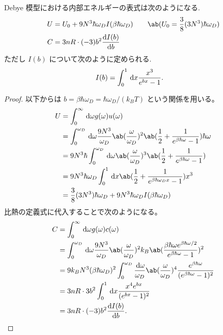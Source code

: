 \documentclass[a4paper,11pt]{jlreq}
\begin{document}
\begin{theorem}
  Debye 模型における内部エネルギーの表式は次のようになる.
  \begin{align}
    U & = U_0 + 9N^3\hbar\omega_DI(\beta\hbar\omega_D) \qquad \ab(U_0 = \frac{3}{8}(3N^3)\hbar\omega_D) \\
    C & = 3nR\cdot(-3)b^2\diff{I(b)}{b}
  \end{align}
  ただし $I(b)$ について次のように定められる.
  \begin{align}
    I(b) & = \int_0^1\dl{x}\frac{x^3}{e^{bx} - 1}.
  \end{align}
\end{theorem}
\begin{proof}
  以下からは $b = \beta\hbar\omega_D = \hbar\omega_D/(k_BT)$ という関係を用いる。
  \begin{align}
    U & = \int_0^\infty\dl{\omega}g(\omega)u(\omega)                                                                                                      \\
      & = \int_0^{\omega_D}\dl{\omega}\frac{9N^3}{\omega_D}\ab(\frac{\omega}{\omega_D})^2\ab(\frac{1}{2} + \frac{1}{e^{\beta\hbar\omega} - 1})\hbar\omega \\
      & = 9N^3\hbar\int_0^{\omega_D}\dl{\omega}\ab(\frac{\omega}{\omega_D})^3\ab(\frac{1}{2} + \frac{1}{e^{\beta\hbar\omega} - 1})                        \\
      & = 9N^3\hbar\omega_D\int_0^1\dl{x}\ab(\frac{1}{2} + \frac{1}{e^{\beta\hbar\omega_Dx} - 1})x^3                                                      \\
      & = \frac{3}{8}(3N^3)\hbar\omega_D + 9N^3\hbar\omega_DI(\beta\hbar\omega_D)
  \end{align}
  比熱の定義式に代入することで次のようになる。
  \begin{align}
    C & = \int_0^\infty\dl{\omega}g(\omega)c(\omega)                                                                                                                         \\
      & = \int_0^{\omega_D}\dl{\omega}\frac{9N^3}{\omega_D}\ab(\frac{\omega}{\omega_D})^2k_B\ab(\frac{\beta\hbar\omega e^{\beta\hbar\omega/2}}{e^{\beta\hbar\omega} - 1})^2  \\
      & = 9k_BN^3(\beta\hbar\omega_D)^2\int_0^{\omega_D}\frac{\dl{\omega}}{\omega_D}\ab(\frac{\omega}{\omega_D})^4\frac{ e^{\beta\hbar\omega}}{(e^{\beta\hbar\omega} - 1)^2} \\
      & = 3nR\cdot 3b^2\int_0^1\dl{x}\frac{x^4e^{bx}}{(e^{bx} - 1)^2}                                                                                                        \\
      & = 3nR\cdot (-3)b^2\diff{I(b)}{b}.
  \end{align}
\end{proof}
\end{document}
